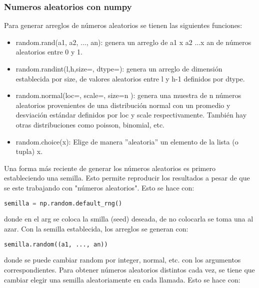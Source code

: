 \documentclass[10pt,oneside]{article}
\begin{document}
\begin{multicols}{2}
                \subsubsection{Numeros aleatorios con numpy}

                Para generar arreglos de números aleatorios se tienen las siguientes funciones:

                \begin{itemize}
                    \item random.rand(a1, a2, ..., an): genera un arreglo de a1 x a2 ...x an de números aleatorios entre 0 y 1.
                    \item random.randint(l,h,size=, dtype=): genera un arreglo de dimensión establecida por size, de valores aleatorios entre l y h-1 definidos por dtype. 
                    \item random.normal(loc=, scale=, size=n ): genera una muestra de n números aleatorios provenientes de una distribución normal con un promedio y desviación estándar definidos por loc y scale respectivamente. También hay otras distribuciones como poisson, binomial, etc.
                    \item random.choice(x): Elige de manera ''aleatoria'' un elemento de la lista (o tupla) x.
                \end{itemize}

                Una forma más reciente de generar los números aleatorios es primero estableciendo una semilla. Esto permite reproducir los resultados a pesar de que se este trabajando con "números aleatorios". Esto se hace con:

                \begin{lstlisting}[language=Python]
semilla = np.random.default_rng()                    
                \end{lstlisting}
                
                donde en el arg se coloca la smilla (seed) deseada, de no colocarla se toma una al azar. Con la semilla establecida, los arreglos se generan con:
                                        
                \begin{lstlisting}[language=Python]
semilla.random((a1, ..., an))                    
                \end{lstlisting}
                
                donde se puede cambiar random por integer, normal, etc. con los argumentos correspondientes. Para obtener números aleatorios distintos cada vez, se tiene que cambiar elegir una semilla aleatoriamente en cada llamada. Esto se hace con:
                

\end{multicols}
\end{document}

